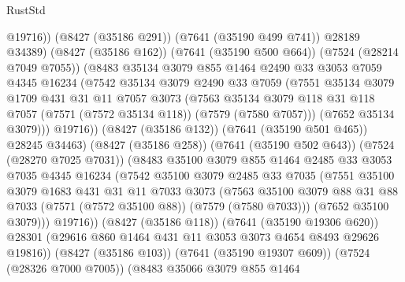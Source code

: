 \begin{lexlean}{RustStd}
\begin{coremodule}
{\begin{coremodule}
{{{{{{{{{{{{{{{{{{{{{{{{{{{{{{{{                    @19716))
                (@8427 (@35186 @291))
                (@7641 (@35190 @499 @741))
                @28189
                @34389)
              (@8427 (@35186 @162))
              (@7641 (@35190 @500 @664))
              (@7524 (@28214 @7049 @7055))
              (@8483
                @35134
                @3079
                @855
                @1464
                @2490
                @33
                @3053
                @7059
                @4345
                @16234
                (@7542
                  @35134
                  @3079
                  @2490
                  @33
                  @7059
                  (@7551
                    @35134
                    @3079
                    @1709
                    @431
                    @31
                    @11
                    @7057
                    @3073
                    (@7563
                      @35134
                      @3079
                      @118
                      @31
                      @118
                      @7057
                      (@7571 (@7572 @35134 @118))
                      (@7579 (@7580 @7057)))
                    (@7652 @35134 @3079)))
                @19716))
            (@8427 (@35186 @132))
            (@7641 (@35190 @501 @465))
            @28245
            @34463)
          (@8427 (@35186 @258))
          (@7641 (@35190 @502 @643))
          (@7524 (@28270 @7025 @7031))
          (@8483
            @35100
            @3079
            @855
            @1464
            @2485
            @33
            @3053
            @7035
            @4345
            @16234
            (@7542
              @35100
              @3079
              @2485
              @33
              @7035
              (@7551
                @35100
                @3079
                @1683
                @431
                @31
                @11
                @7033
                @3073
                (@7563
                  @35100
                  @3079
                  @88
                  @31
                  @88
                  @7033
                  (@7571 (@7572 @35100 @88))
                  (@7579 (@7580 @7033)))
                (@7652 @35100 @3079)))
            @19716))
        (@8427 (@35186 @118))
        (@7641 (@35190 @19306 @620))
        @28301
        (@29616 @860 @1464 @431 @11 @3053 @3073 @4654 @8493 @29626 @19816))
      (@8427 (@35186 @103))
      (@7641 (@35190 @19307 @609))
      (@7524 (@28326 @7000 @7005))
      (@8483
        @35066
        @3079
        @855
        @1464
}}}}}}}}}}}}}}}}}}}}}}}}}}}}}}}}
\end{coremodule}}
\end{coremodule}
\end{lexlean}
